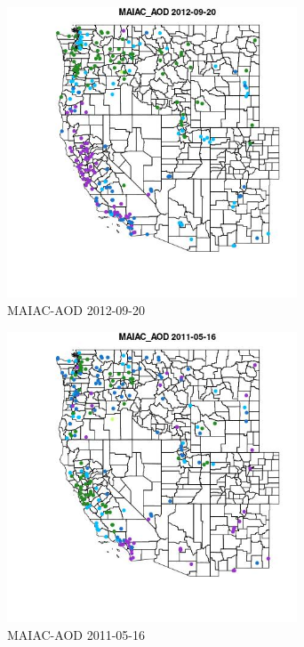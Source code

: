 \begin{figure} 
\centering  
\includegraphics[width=0.77\textwidth]{Code_Outputs/ML_input_report_ML_input_PM25_Step5_part_d_de_duplicated_aves_ML_input_MapObsMAIAC_AOD2012-09-20.jpg} 
\caption{\label{fig:ML_input_report_ML_input_PM25_Step5_part_d_de_duplicated_aves_ML_inputMapObsMAIAC_AOD2012-09-20}MAIAC-AOD 2012-09-20} 
\end{figure} 
 

\begin{figure} 
\centering  
\includegraphics[width=0.77\textwidth]{Code_Outputs/ML_input_report_ML_input_PM25_Step5_part_d_de_duplicated_aves_ML_input_MapObsMAIAC_AOD2011-05-16.jpg} 
\caption{\label{fig:ML_input_report_ML_input_PM25_Step5_part_d_de_duplicated_aves_ML_inputMapObsMAIAC_AOD2011-05-16}MAIAC-AOD 2011-05-16} 
\end{figure} 
 

